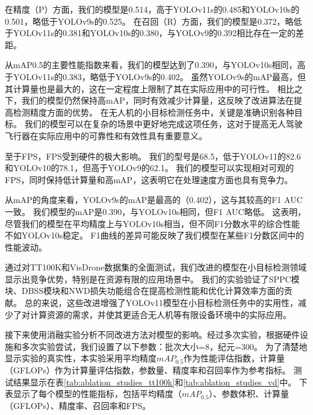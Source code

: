 在精度（P）方面，我们的模型是0.514，高于YOLOv11s的0.485和YOLOv10s的0.501，略低于YOLOv9s的0.525。 在召回（R）方面，我们的模型是0.372，略低于YOLOv11s的0.381和YOLOv10s的0.380，与YOLOv9的0.392相比存在一定的差距。

从mAP0.5的主要性能指数来看，我们的模型达到了0.390，与YOLOv10s相同，高于YOLOv11s的0.383，略低于YOLOv9s的0.402。 虽然YOLOv9s的mAP最高，但其计算量也是最大的，这在一定程度上限制了其在实际应用中的可行性。 相比之下，我们的模型仍然保持高mAP，同时有效减少计算量，这反映了改进算法在提高检测精度方面的优势。 在无人机的小目标检测任务中，关键是准确识别各种目标。 我们的模型可以在复杂的场景中更好地完成这项任务，这对于提高无人驾驶飞行器在实际应用中的可靠性和有效性具有重要意义。

至于FPS，FPS受到硬件的极大影响。 我们的型号是68.5，低于YOLOv11的82.6和YOLOv10的78.1，但高于YOLOv9的62.1。 我们的模型可以实现相对可观的FPS，同时保持低计算量和高mAP，这表明它在处理速度方面也具有竞争力。

从mAP的角度来看，YOLOv9s的mAP是最高的（0.402），这与其较高的F1 AUC一致。 我们模型的mAP是0.390，与YOLOv10s相同，但F1 AUC略低。 这表明，尽管我们的模型在平均精度上与YOLOv10s相当，但不同F1分数水平的综合性能不如YOLOv10s稳定。 F1曲线的差异可能反映了我们模型在某些F1分数区间中的性能波动。

通过对TT100K和VisDrone数据集的全面测试，我们改进的模型在小目标检测领域显示出竞争优势，特别是在资源有限的应用场景中。 我们的实验验证了SPPC模块、DBSS模块和NWD损失功能组合在提高检测性能和优化计算效率方面的贡献。 总的来说，这些改进增强了YOLOv11模型在小目标检测任务中的实用性，减少了对计算资源的需求，并使其更适合无人机等有限设备环境中的实际应用。

接下来使用消融实验分析不同改进方法对模型的影响。经过多次实验，根据硬件设施和多次实验尝试，我们设置了以下参数：批次大小=8，纪元=300。 为了清楚地显示实验的真实性，本实验采用平均精度$mAP_{0.5}$作为性能评估指数，计算量（GFLOPs）作为计算量评估指数，参数量、精度率和召回率作为参考指标。 测试结果显示在表\ref{tab:ablation_studies_tt100k}和\ref{tab:ablation_studies_vd}中。 下表显示了每个模型的性能指标，包括平均精度（$mAP_{0.5}$）、参数体积、计算量（GFLOPs）、精度率、召回率和FPS。

